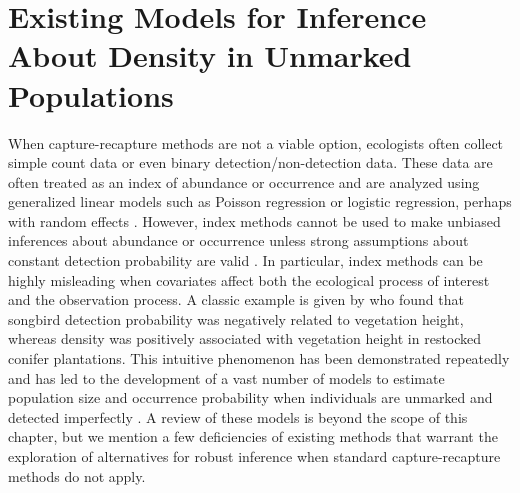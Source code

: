 \section{Existing Models for Inference About Density in Unmarked Populations}
\label{Sect.existing-unmarked}
When capture-recapture methods are not a viable option, ecologists
often collect simple count data or even binary detection/non-detection
data. %
These data are often treated as an index of abundance or occurrence
and are analyzed using generalized linear models such as
Poisson regression or logistic regression, perhaps with random
effects \citep{zuur_etal:2009}. %
However, index methods cannot be used to make unbiased inferences
about abundance or occurrence unless strong assumptions about constant
detection probability are valid
\citep{williams_etal:2002,sollmann_etal:2013bioc}.
In particular,
index methods can be highly misleading
when covariates affect both the ecological process of interest
and the observation process. A classic example is given by
\citet{bibby_buckland:1987} who found that songbird detection
probability was negatively related to vegetation height, whereas
density was positively associated with vegetation height in restocked
conifer plantations. This intuitive phenomenon has been
demonstrated repeatedly \citep{kery:2008,sillett_etal:2012} and has led to the
development of a vast number of models to estimate population size and
occurrence probability when individuals are unmarked and detected
imperfectly
\citep{buckland_etal:2001,williams_etal:2002,mackenzie_etal:2006,royle_dorazio:2008}.
A review of these
models is beyond the scope of this
chapter, but we mention a few deficiencies of existing methods
that warrant the exploration of alternatives for robust inference when
standard capture-recapture methods do not apply.

